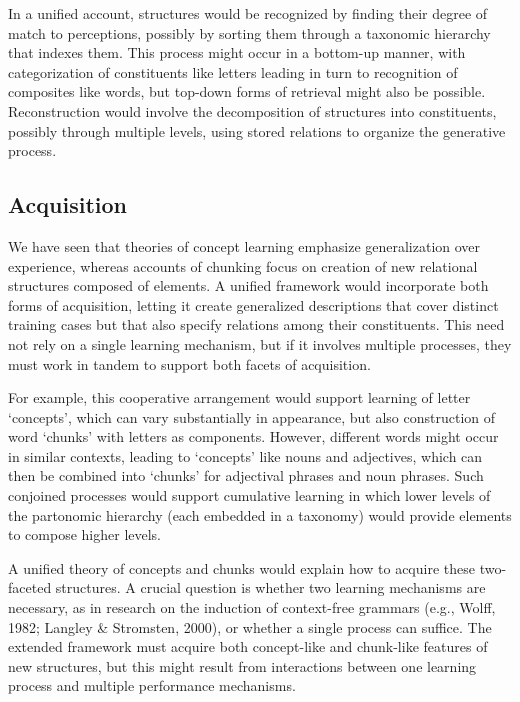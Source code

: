 \documentclass[11pt,letterpaper]{article}
\begin{document}
In a unified account, structures would be recognized by finding their
degree of match to perceptions, possibly by sorting them through a
taxonomic hierarchy that indexes them. This process might occur in a
bottom-up manner, with categorization of constituents like letters
leading in turn to recognition of composites like words, but top-down
forms of retrieval might also be possible. Reconstruction would involve
the decomposition of structures into constituents, possibly through
multiple levels, using stored relations to organize the generative
process. 

\subsection{Acquisition}


We have seen that theories of concept learning emphasize generalization
over experience, whereas accounts of chunking focus on creation of new
relational structures composed of elements. A unified framework would
incorporate both forms of acquisition, letting it create generalized
descriptions that cover distinct training cases but that also specify
relations among their constituents. This need not rely on a single
learning mechanism, but if it involves multiple processes, they must
work in tandem to support both facets of acquisition. 

For example, this cooperative arrangement would support learning of
letter `concepts', which can vary substantially in appearance, but
also construction of word `chunks' with letters as components.
However, different words might occur in similar contexts, leading 
to `concepts' like nouns and adjectives, which can then be
combined into `chunks' for adjectival phrases and noun phrases.
Such conjoined processes would support cumulative learning in which
lower levels of the partonomic hierarchy (each embedded in a 
taxonomy) would provide elements to compose higher levels. 


A unified theory of concepts and chunks would explain how to acquire
these two-faceted structures. A crucial question is whether two
learning mechanisms are necessary, as in research on the induction of
context-free grammars (e.g., Wolff, 1982; Langley \& Stromsten, 2000), 
or whether a single process can suffice. The extended framework must 
acquire both concept-like and chunk-like features of new structures, 
but this might result from interactions between one learning process 
and multiple performance mechanisms.
\end{document}
